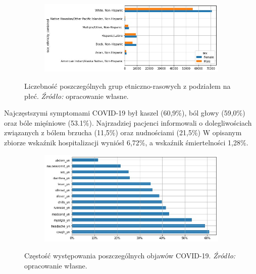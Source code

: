 \documentclass[polish, twoside, 12pt, a4paper]{article}
\theoremstyle{definition}
\theoremstyle{plain}
\theoremstyle{remark}
\begin{document}
\begin{figure}[H]
  \centering
  \begin{subfigure}[t]{\textwidth}
    \includegraphics[width=15cm]{race_sex_count_plot.jpg}
  \end{subfigure}
  \captionsetup{margin=10pt,font=small,labelfont=bf,width=.8\textwidth}
  \caption{Liczebność poszczególnych grup etniczno-rasowych z podziałem na płeć. \textit{Źródło:} opracowanie własne.}\label{fig:figure:sex-race-count}
\end{figure}

Najczęstszymi symptomami COVID-19 był kaszel (60,9\%), ból głowy (59,0\%) oraz bóle mięśniowe (53.1\%). Najrzadziej pacjenci informowali o dolegliwościach związanych z bólem brzucha (11,5\%) oraz nudnościami (21,5\%) W opisanym zbiorze wskaźnik hospitalizacji wyniósł 6,72\%, a wskaźnik śmiertelności 1,28\%.

\begin{figure}[H]
  \centering
  \begin{subfigure}[t]{\textwidth}
    \includegraphics[width=15cm]{symptoms-freq.jpg}
  \end{subfigure}
  \captionsetup{margin=10pt,font=small,labelfont=bf,width=.8\textwidth}
  \caption{Częstość występowania poszczególnych objawów COVID-19. \textit{Źródło:} opracowanie własne.}\label{fig:figure:xx4}
\end{figure}
\end{document}
